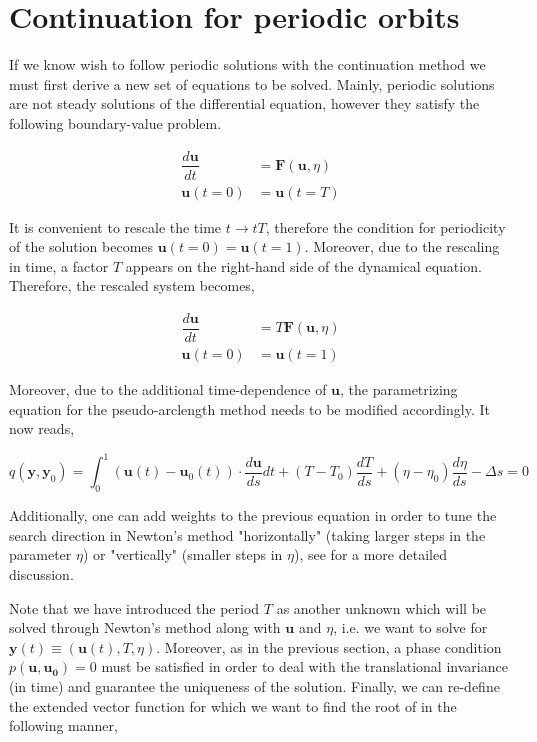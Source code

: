 \section{Continuation for periodic orbits}

If we know wish to follow periodic solutions with the continuation method we
must first derive a new set of equations to be solved. Mainly, periodic solutions
are not steady solutions of the differential equation, however they satisfy
the following boundary-value problem.

\begin{align}
    \dfrac{d\bm{u}}{dt} &= \bm{F}(\bm{u}, \eta) \\
    \bm{u}(t=0) &= \bm{u}(t=T)
\end{align}

It is convenient to rescale the time $t\to tT$, therefore the condition for
periodicity of the solution becomes $\bm{u}(t=0) = \bm{u}(t=1)$. Moreover,
due to the rescaling in time, a factor $T$ appears on the right-hand side of 
the dynamical equation. Therefore, the rescaled system becomes,

\begin{align}
    \dfrac{d\bm{u}}{dt} &= T\bm{F}(\bm{u}, \eta) \\
    \bm{u}(t=0) &= \bm{u}(t=1)
\end{align}

Moreover, due to the additional time-dependence of $\bm{u}$, the parametrizing equation for the pseudo-arclength
method needs to be modified accordingly. It now reads,

\begin{equation}
    q(\bm{y}, \bm{y}_0) = \int_0^1  (\bm{u}(t) -  \bm{u}_0(t)) \cdot \dfrac{d\bm{u}}{ds} dt 
        + (T - T_0) \dfrac{dT}{ds} + (\eta - \eta_0) \dfrac{d\eta}{ds} - \Delta s = 0 
\end{equation}

Additionally, one can add weights to the
previous equation in order to tune the search direction in Newton's method "horizontally"
(taking larger steps in the parameter $\eta$) or "vertically" (smaller steps in $\eta$),
see \cite{Uecker2017pde2path} for a more detailed discussion.

Note that we have introduced the period $T$ as another unknown which will be solved
through Newton's method along with $\bm{u}$ and $\eta$, i.e. we want to solve
for $\bm{y}(t) \equiv (\bm{u}(t), T, \eta)$. Moreover, as in the previous section, a phase condition
$p(\bm{u}, \bm{u_0}) = 0$ must be satisfied in order to deal with the translational invariance (in time) and
guarantee the uniqueness of the solution.
Finally, we can re-define the
extended vector function for which we want to find the root of in the following manner,

